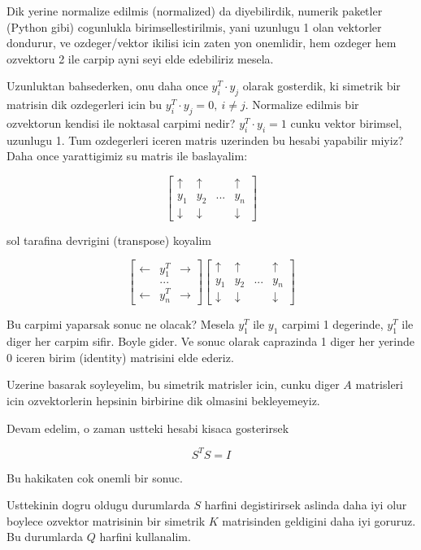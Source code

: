 \documentclass[12pt,fleqn]{article}\usepackage{../common}
\begin{document}
Dik yerine normalize edilmis (normalized) da diyebilirdik, numerik paketler
(Python gibi) cogunlukla birimsellestirilmis, yani uzunlugu 1 olan
vektorler dondurur, ve ozdeger/vektor ikilisi icin zaten yon onemlidir, hem
ozdeger hem ozvektoru 2 ile carpip ayni seyi elde edebiliriz mesela.

Uzunluktan bahsederken, onu daha once $y_i^T \cdot y_j$ olarak gosterdik,
ki simetrik bir matrisin dik ozdegerleri icin bu $y_i^T \cdot y_j = 0, \ i
\ne j$. 
Normalize edilmis bir ozvektorun kendisi ile noktasal carpimi nedir? 
$y_i^T \cdot y_i = 1$ cunku vektor birimsel, uzunlugu 1. Tum
ozdegerleri iceren matris uzerinden bu hesabi yapabilir miyiz? Daha once
yarattigimiz su matris ile baslayalim:

\[ 
\left[\begin{array}{cccc}
\uparrow & \uparrow &  & \uparrow \\
y_1 & y_2 & ... & y_n \\
\downarrow & \downarrow &  & \downarrow 
\end{array}\right]
\]

sol tarafina devrigini (transpose) koyalim

\[ 
\left[\begin{array}{ccc}
\leftarrow & y_1^T & \rightarrow \\
 & ... & \\
\leftarrow & y_n^T & \rightarrow 
\end{array}\right]
\left[\begin{array}{cccc}
\uparrow & \uparrow &  & \uparrow \\
y_1 & y_2 & ... & y_n \\
\downarrow & \downarrow &  & \downarrow 
\end{array}\right]
\]

Bu carpimi yaparsak sonuc ne olacak? Mesela $y_1^T$ ile $y_1$ carpimi 1
degerinde, $y_1^T$ ile diger her carpim sifir. Boyle gider. Ve sonuc olarak
caprazinda 1 diger her yerinde 0 iceren birim (identity) matrisini elde
ederiz.

Uzerine basarak soyleyelim, bu simetrik matrisler icin, cunku diger $A$
matrisleri icin ozvektorlerin hepsinin birbirine dik olmasini
bekleyemeyiz. 

Devam edelim, o zaman ustteki hesabi kisaca gosterirsek

\[ S^T S = I \]

Bu hakikaten cok onemli bir sonuc. 

Usttekinin dogru oldugu durumlarda $S$ harfini degistirirsek aslinda daha iyi
olur boylece ozvektor matrisinin bir simetrik $K$ matrisinden geldigini
daha iyi goruruz. Bu durumlarda $Q$ harfini kullanalim. 
\end{document}
